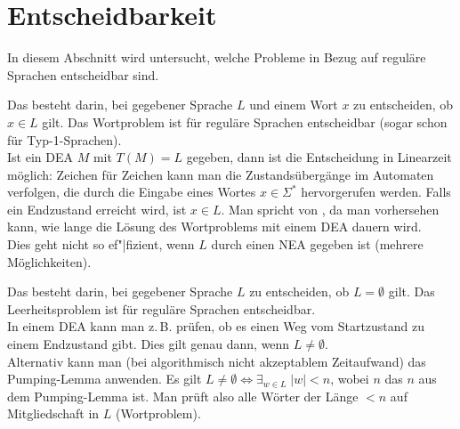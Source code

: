 \pagebreak

\section{%
    Entscheidbarkeit%
}

\begin{Bem}
    In diesem Abschnitt wird untersucht, welche Probleme in Bezug auf
    reguläre Sprachen entscheidbar sind.
\end{Bem}

\begin{Bem}
    Das  besteht darin, bei gegebener Sprache $L$
    und einem Wort $x$ zu entscheiden, ob $x \in L$ gilt.
    Das Wortproblem ist für reguläre Sprachen entscheidbar
    (sogar schon für Typ-1-Sprachen).\\
    Ist ein DEA $M$ mit $T(M) = L$ gegeben, dann ist die Entscheidung in
    Linearzeit möglich:
    Zeichen für Zeichen kann man die Zustandsübergänge im Automaten verfolgen,
    die durch die Eingabe eines Wortes $x \in \Sigma^\ast$ hervorgerufen
    werden.
    Falls ein Endzustand erreicht wird, ist $x \in L$.
    Man spricht von , da man vorhersehen kann, wie lange
    die Lösung des Wortproblems mit einem DEA dauern wird.\\
    Dies geht nicht so ef"|fizient, wenn $L$ durch einen NEA gegeben ist
    (mehrere Möglichkeiten).
\end{Bem}

\linie

\begin{Bem}
    Das  besteht darin, bei gegebener Sprache $L$
    zu entscheiden, ob $L = \emptyset$ gilt.
    Das Leerheitsproblem ist für reguläre Sprachen entscheidbar.\\
    In einem DEA kann man z.\,B. prüfen, ob es einen Weg vom Startzustand zu
    einem Endzustand gibt.
    Dies gilt genau dann, wenn $L \not= \emptyset$.\\
    Alternativ kann man (bei algorithmisch nicht akzeptablem Zeitaufwand)
    das Pumping-Lemma anwenden.
    Es gilt $L \not= \emptyset \iff \exists_{w \in L}\; |w| < n$, wobei
    $n$ das $n$ aus dem Pumping-Lemma ist.
    Man prüft also alle Wörter der Länge $< n$ auf Mitgliedschaft
    in $L$ (Wortproblem).
\end{Bem}

\linie

